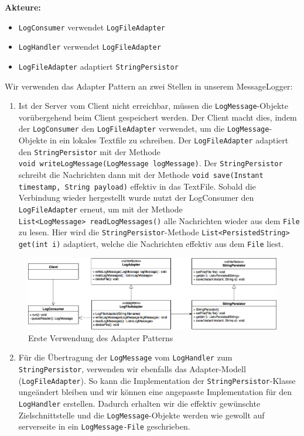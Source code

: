 \documentclass[12pt,a4paper,twosided]{scrartcl}
\begin{document}
\textbf{Akteure:}
\begin{itemize}
	\item \texttt{LogConsumer} verwendet \texttt{LogFileAdapter}
	\item \texttt{LogHandler} verwendet \texttt{LogFileAdapter}
	\item \texttt{LogFileAdapter} adaptiert \texttt{StringPersistor}
\end{itemize}

Wir verwenden das Adapter Pattern an zwei Stellen in unserem MessageLogger:

\begin{enumerate}
	\item Ist der Server vom Client nicht erreichbar, müssen die \texttt{LogMessage}-Objekte vorübergehend beim Client gespeichert werden. Der Client macht dies, indem der \texttt{LogConsumer} den \texttt{LogFileAdapter} verwendet, um die \texttt{LogMessage}-Objekte in ein lokales Textfile zu schreiben. Der \texttt{LogFileAdapter} adaptiert den \texttt{StringPersistor} mit der Methode \\ \texttt{void writeLogMessage(LogMessage logMessage)}. Der \texttt{StringPersistor} schreibt die Nachrichten dann mit der Methode \texttt{void save(Instant timestamp, String payload)} effektiv in das TextFile. Sobald die Verbindung wieder hergestellt wurde nutzt der LogConsumer den \texttt{LogFileAdapter} erneut, um mit der Methode \\ \texttt{List<LogMessage> readLogMessages()} alle Nachrichten wieder aus dem \texttt{File} zu lesen. Hier wird die \texttt{StringPersistor}-Methode \texttt{List<PersistedString> get(int i)} adaptiert, welche die Nachrichten effektiv aus dem \texttt{File} liest.
\end{enumerate}

\begin{figure}[h]
	\centering
	\includegraphics[width=0.7\linewidth]{img/AdapterPatternLC}
	\caption{Erste Verwendung des Adapter Patterns}
	\label{fig:adapterpatternlc}
\end{figure}

\begin{enumerate}	
	\setcounter{enumi}{1}
	\item Für die Übertragung der \texttt{LogMessage} vom \texttt{LogHandler} zum \texttt{StringPersistor}, verwenden wir ebenfalls das Adapter-Modell (\texttt{LogFileAdapter}). So kann die Implementation der \texttt{StringPersistor}-Klasse ungeändert bleiben und wir können eine angepasste Implementation für den \texttt{LogHandler} erstellen. Dadurch erhalten wir die effektiv gewünschte Zielschnittstelle und die \texttt{LogMessage}-Objekte werden wie gewollt auf serverseite in ein \texttt{LogMessage-File} geschrieben.
\end{enumerate}
\end{document}

